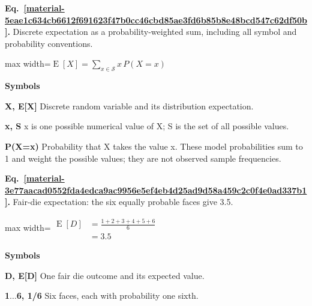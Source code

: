 \documentclass[11pt,a4paper]{article}
\begin{document}
\par\medskip
\begin{samepage}
\label{material-5eae1c634cb6612f691623f47b0cc46cbd85ae3fd6b85b8e48bcd547c62df50b}
\noindent\textbf{Eq.~\ref*{material-5eae1c634cb6612f691623f47b0cc46cbd85ae3fd6b85b8e48bcd547c62df50b}.} Discrete expectation as a probability-weighted sum, including all symbol and probability conventions.\par\nopagebreak
\begin{center}\begin{adjustbox}{max width=\linewidth}$\displaystyle \operatorname{E}[X] = \sum_{x \in \mathcal{S}} x\,P(X=x)$\end{adjustbox}\end{center}

\par\noindent\textbf{Symbols}

\par\noindent\textbf{X, E[X]} Discrete random variable and its distribution expectation.

\par\noindent\textbf{x, S} x is one possible numerical value of X; S is the set of all possible values.

\par\noindent\textbf{P(X=x)} Probability that X takes the value x. These model probabilities sum to 1 and weight the possible values; they are not observed sample frequencies.

\end{samepage}
\medskip

\par\medskip
\begin{samepage}
\label{material-3e77aacad0552fda4edca9ac9956e5ef4eb4d25ad9d58a459c2c0f4e0ad337b1}
\noindent\textbf{Eq.~\ref*{material-3e77aacad0552fda4edca9ac9956e5ef4eb4d25ad9d58a459c2c0f4e0ad337b1}.} Fair-die expectation: the six equally probable faces give 3.5.\par\nopagebreak
\begin{center}\begin{adjustbox}{max width=\linewidth}$\displaystyle \begin{aligned}\operatorname{E}[D]&=\frac{1+2+3+4+5+6}{6}\\&=3.5\end{aligned}$\end{adjustbox}\end{center}

\par\noindent\textbf{Symbols}

\par\noindent\textbf{D, E[D]} One fair die outcome and its expected value.

\par\noindent\textbf{1\ensuremath{\ldots}6, 1/6} Six faces, each with probability one sixth.

\end{samepage}
\medskip
\end{document}
